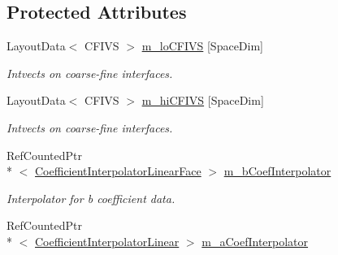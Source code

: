 \subsection*{Protected Attributes}
\begin{DoxyCompactItemize}
\item 
\hypertarget{class_a_m_r_non_linear_multi_comp_op_a15ba0831b7d6ed8509954fcdedbc68b2}{Layout\-Data$<$ C\-F\-I\-V\-S $>$ \hyperlink{class_a_m_r_non_linear_multi_comp_op_a15ba0831b7d6ed8509954fcdedbc68b2}{m\-\_\-lo\-C\-F\-I\-V\-S} \mbox{[}Space\-Dim\mbox{]}}\label{class_a_m_r_non_linear_multi_comp_op_a15ba0831b7d6ed8509954fcdedbc68b2}

\begin{DoxyCompactList}\small\item\em Intvects on coarse-\/fine interfaces. \end{DoxyCompactList}\item 
\hypertarget{class_a_m_r_non_linear_multi_comp_op_ad98133545fea83f7ea83d97b571864ab}{Layout\-Data$<$ C\-F\-I\-V\-S $>$ \hyperlink{class_a_m_r_non_linear_multi_comp_op_ad98133545fea83f7ea83d97b571864ab}{m\-\_\-hi\-C\-F\-I\-V\-S} \mbox{[}Space\-Dim\mbox{]}}\label{class_a_m_r_non_linear_multi_comp_op_ad98133545fea83f7ea83d97b571864ab}

\begin{DoxyCompactList}\small\item\em Intvects on coarse-\/fine interfaces. \end{DoxyCompactList}\item 
\hypertarget{class_a_m_r_non_linear_multi_comp_op_a355e5cdcad525f983a8122bcf0ab09b4}{Ref\-Counted\-Ptr\\*
$<$ \hyperlink{class_coefficient_interpolator_linear_face}{Coefficient\-Interpolator\-Linear\-Face} $>$ \hyperlink{class_a_m_r_non_linear_multi_comp_op_a355e5cdcad525f983a8122bcf0ab09b4}{m\-\_\-b\-Coef\-Interpolator}}\label{class_a_m_r_non_linear_multi_comp_op_a355e5cdcad525f983a8122bcf0ab09b4}

\begin{DoxyCompactList}\small\item\em Interpolator for b coefficient data. \end{DoxyCompactList}\item 
\hypertarget{class_a_m_r_non_linear_multi_comp_op_a725b0c0f13966b9b4ef303219a25fe7d}{Ref\-Counted\-Ptr\\*
$<$ \hyperlink{class_coefficient_interpolator_linear}{Coefficient\-Interpolator\-Linear} $>$ \hyperlink{class_a_m_r_non_linear_multi_comp_op_a725b0c0f13966b9b4ef303219a25fe7d}{m\-\_\-a\-Coef\-Interpolator}}\label{class_a_m_r_non_linear_multi_comp_op_a725b0c0f13966b9b4ef303219a25fe7d}


\end{DoxyCompactItemize}
